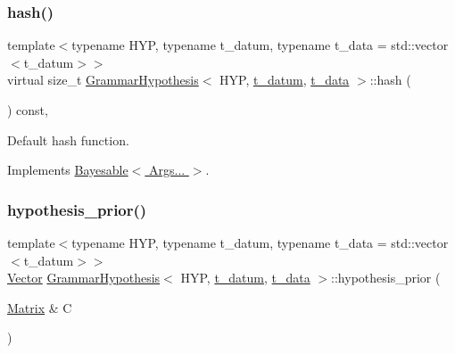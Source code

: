 \mbox{\label{class_grammar_hypothesis_a5b269a5ed433b94f6b2796f30a15fd9e}} 
\subsubsection{\texorpdfstring{hash()}{hash()}}
{\footnotesize\ttfamily template$<$typename H\+YP, typename t\+\_\+datum, typename t\+\_\+data = std\+::vector$<$t\+\_\+datum$>$$>$ \\
virtual size\+\_\+t \hyperlink{class_grammar_hypothesis}{Grammar\+Hypothesis}$<$ H\+YP, \hyperlink{class_bayesable_a7c93a2eeab708378eb321745908718d4}{t\+\_\+datum}, \hyperlink{class_bayesable_a70a593a67c7d43239ecc06bb4fd06a6b}{t\+\_\+data} $>$\+::hash (\begin{DoxyParamCaption}{ }\end{DoxyParamCaption}) const\hspace{0.3cm}{\ttfamily [inline]}, {\ttfamily [virtual]}}



Default hash function. 



Implements \hyperlink{class_bayesable_ab77a023d33951448e6edb2e1bc79c5ae}{Bayesable$<$ Args... $>$}.

\mbox{\label{class_grammar_hypothesis_a9fb937f94fbe121dcba164f378e99080}} 
\subsubsection{\texorpdfstring{hypothesis\+\_\+prior()}{hypothesis\_prior()}}
{\footnotesize\ttfamily template$<$typename H\+YP, typename t\+\_\+datum, typename t\+\_\+data = std\+::vector$<$t\+\_\+datum$>$$>$ \\
\hyperlink{_eigen_numerics_8h_aca2956bc379bce2ed88ab3c0e1b61d1d}{Vector} \hyperlink{class_grammar_hypothesis}{Grammar\+Hypothesis}$<$ H\+YP, \hyperlink{class_bayesable_a7c93a2eeab708378eb321745908718d4}{t\+\_\+datum}, \hyperlink{class_bayesable_a70a593a67c7d43239ecc06bb4fd06a6b}{t\+\_\+data} $>$\+::hypothesis\+\_\+prior (\begin{DoxyParamCaption}\item[{\hyperlink{_eigen_numerics_8h_a645222978e81acfb2523a9bce34aecc0}{Matrix} \&}]{C }\end{DoxyParamCaption})\hspace{0.3cm}{\ttfamily [inline]}}

